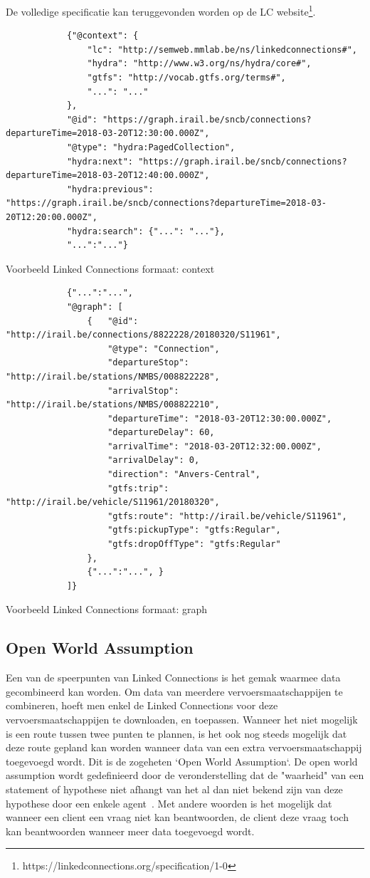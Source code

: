 De volledige specificatie kan teruggevonden worden op de LC website\footnote{https://linkedconnections.org/specification/1-0}.

\begin{listing}[!h]
	\begin{verbatim}
			{"@context": {
			    "lc": "http://semweb.mmlab.be/ns/linkedconnections#",
			    "hydra": "http://www.w3.org/ns/hydra/core#",
			    "gtfs": "http://vocab.gtfs.org/terms#",
			    "...": "..."
			},
			"@id": "https://graph.irail.be/sncb/connections?departureTime=2018-03-20T12:30:00.000Z",
			"@type": "hydra:PagedCollection",
			"hydra:next": "https://graph.irail.be/sncb/connections?departureTime=2018-03-20T12:40:00.000Z",
			"hydra:previous": "https://graph.irail.be/sncb/connections?departureTime=2018-03-20T12:20:00.000Z",
			"hydra:search": {"...": "..."},
			"...":"..."}
		\end{verbatim}
	\caption{Voorbeeld Linked Connections formaat: context}
	\label{code:2:linkedconnections-response-context}
\end{listing}
\begin{listing}[!h]
	\begin{verbatim}
			{"...":"...",
			"@graph": [
				{   "@id": "http://irail.be/connections/8822228/20180320/S11961",
				    "@type": "Connection",
    				"departureStop": "http://irail.be/stations/NMBS/008822228",
    				"arrivalStop": "http://irail.be/stations/NMBS/008822210",
    				"departureTime": "2018-03-20T12:30:00.000Z",
    				"departureDelay": 60,
    				"arrivalTime": "2018-03-20T12:32:00.000Z",
    				"arrivalDelay": 0,
    				"direction": "Anvers-Central",
    				"gtfs:trip": "http://irail.be/vehicle/S11961/20180320",
    				"gtfs:route": "http://irail.be/vehicle/S11961",
    				"gtfs:pickupType": "gtfs:Regular",
    				"gtfs:dropOffType": "gtfs:Regular"
				},
				{"...":"...", }
			]}
	\end{verbatim}
\caption{Voorbeeld Linked Connections formaat: graph}
\label{code:2:linkedconnections-response-graph}
\end{listing}
 
\subsection{Open World Assumption}
Een van de speerpunten van Linked Connections is het gemak waarmee data gecombineerd kan worden. Om data van meerdere vervoersmaatschappijen te combineren, hoeft men enkel de Linked Connections voor deze vervoersmaatschappijen te downloaden, en  toepassen. Wanneer het niet mogelijk is een route tussen twee punten te plannen, is het ook nog steeds mogelijk dat deze route gepland kan worden wanneer data van een extra vervoersmaatschappij toegevoegd wordt. Dit is de zogeheten `Open World Assumption`. De open world assumption wordt gedefinieerd door de veronderstelling dat de "waarheid" van een statement of hypothese niet afhangt van het al dan niet bekend zijn van deze hypothese door een enkele agent~\citep{Moore15}. Met andere woorden is het mogelijk dat wanneer een client een vraag niet kan beantwoorden, de client deze vraag toch kan beantwoorden wanneer meer data toegevoegd wordt.


